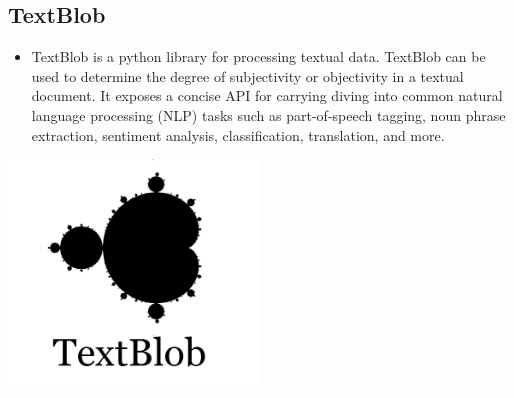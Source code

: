 \subsection{TextBlob}
\begin{minipage}{0.4\textwidth}
\begin{itemize}
\item[\textbf{\emph{}}] 
TextBlob is a python library for processing textual data. TextBlob can be used to determine the degree of subjectivity or objectivity in a textual document.
It exposes a concise API for carrying diving into common natural language processing (NLP) tasks such as part-of-speech tagging, noun phrase extraction, sentiment analysis, classification, translation, and more.\cite{ref43}
\end{itemize}
\end{minipage}%
%
\begin{minipage}{0.4\textwidth}
\begin{center}
    \includegraphics[width=0.5\textwidth]{images/textblob_logo}
    \label{img:g}
\end{center}
\end{minipage}


